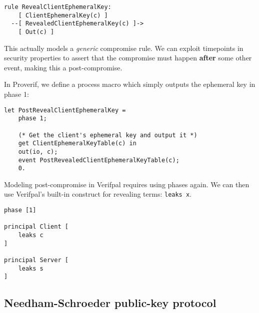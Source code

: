 \lstset{language=tamarin}
\begin{lstlisting}
rule RevealClientEphemeralKey:
    [ ClientEphemeralKey(c) ]
  --[ RevealedClientEphemeralKey(c) ]->
    [ Out(c) ]
\end{lstlisting}

This actually models a \textit{generic} compromise rule. We can exploit timepoints in security properties to assert that the compromise must happen \textbf{after} some other event, making this a post-compromise.

In Proverif, we define a process macro which simply outputs the ephemeral key in phase 1:

\lstset{language=proverif}
\begin{lstlisting}
let PostRevealClientEphemeralKey =
    phase 1;

    (* Get the client's ephemeral key and output it *)
    get ClientEphemeralKeyTable(c) in
    out(io, c);
    event PostRevealedClientEphemeralKeyTable(c);
    0.
\end{lstlisting}

\lstset{language=verifpal}
Modeling post-compromise in Verifpal requires using phases again. We can then use Verifpal's built-in construct for revealing terms: \lstinline{leaks x}.  
\begin{lstlisting}
phase [1]

principal Client [
    leaks c
]

principal Server [
    leaks s
]
\end{lstlisting}

\subsection{Needham-Schroeder public-key protocol}

